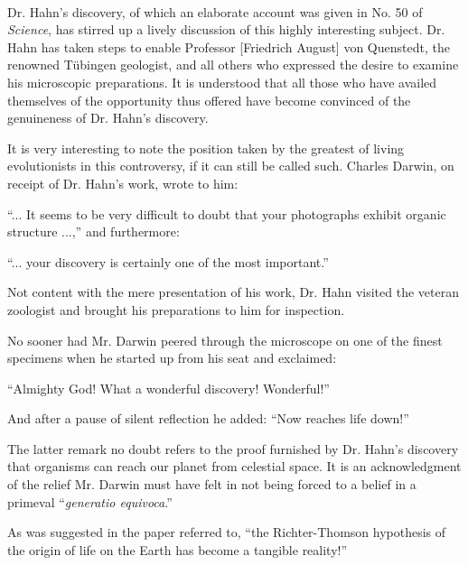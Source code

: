 \documentclass[a4paper, 12pt, oneside]{article}
\begin{document}
\paragraph*{}
Dr. Hahn's discovery, of which an elaborate account was given in No. 50 of \emph{Science}, has stirred up a lively discussion of this highly interesting subject. Dr. Hahn has taken steps to enable Professor [Friedrich August] von Quenstedt, the renowned Tübingen geologist, and all others who expressed the desire to examine his microscopic preparations. It is understood that all those who have availed themselves of the opportunity thus offered have become convinced of the genuineness of Dr. Hahn's discovery.

It is very interesting to note the position taken by the greatest of living evolutionists in this controversy, if it can still be called such. Charles Darwin, on receipt of Dr. Hahn's work, wrote to him:

``... It seems to be very difficult to doubt that your photographs exhibit organic structure ...,'' and furthermore:

``... your discovery is certainly one of the most important.''

Not content with the mere presentation of his work, Dr. Hahn visited the veteran zoologist and brought his preparations to him for inspection.

No sooner had Mr. Darwin peered through the microscope on one of the finest specimens when he started up from his seat and exclaimed:

``Almighty God! What a wonderful discovery! Wonderful!''

And after a pause of silent reflection he added: ``Now reaches life down!''

The latter remark no doubt refers to the proof furnished by Dr. Hahn's discovery that organisms can reach our planet from celestial space. It is an acknowledgment of the relief Mr. Darwin must have felt in not being forced to a belief in a primeval ``\emph{generatio equivoca}.''

As was suggested in the paper referred to, ``the Richter-Thomson hypothesis of the origin of life on the Earth has become a tangible reality!''
\clearpage
\section{}
\subsection{}
\end{document}
